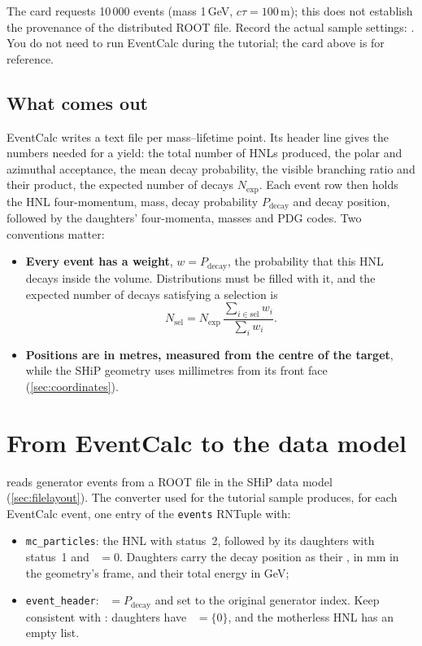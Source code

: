 \begin{note}
The card requests 10\,000 events (mass 1\,GeV, $c\tau=100$\,m);
this does not establish the provenance of the distributed ROOT file.
Record the actual sample settings: . You do not need to run EventCalc during the
tutorial; the card above is for reference.
\end{note}

\subsection{What comes out}

EventCalc writes a text file per mass--lifetime point. Its header line gives
the numbers needed for a yield: the total number of HNLs produced, the polar
and azimuthal acceptance, the mean decay probability, the visible branching
ratio and their product, the expected number of decays $N_\mathrm{exp}$. Each
event row then holds the HNL four-momentum, mass, decay probability
$P_\mathrm{decay}$ and decay position, followed by the daughters'
four-momenta, masses and PDG codes. Two conventions matter:

\begin{itemize}
  \item \textbf{Every event has a weight}, $w = P_\mathrm{decay}$, the
        probability that this HNL decays inside the volume. Distributions must
        be filled with it, and the expected number of decays satisfying a
        selection is
        \[
          N_\mathrm{sel} = N_\mathrm{exp}\,
          \frac{\sum_{i\in\mathrm{sel}} w_i}{\sum_{i} w_i}.
        \]
  \item \textbf{Positions are in metres, measured from the centre of the
        target}, while the SHiP geometry uses millimetres from its front face
        (\cref{sec:coordinates}).
\end{itemize}

\section{From EventCalc to the data model}

 reads generator events from a ROOT file in the SHiP data model
(\cref{sec:filelayout}). The converter used for the tutorial sample
 produces, for each EventCalc event, one entry of
the \texttt{events} RNTuple with:

\begin{itemize}
  \item \texttt{mc\_particles}: the HNL with status~2, followed by its
        daughters with status~1 and ~$=0$. Daughters carry
        the decay position as their , in mm in the geometry's
        frame, and their total energy in GeV;
  \item \texttt{event\_header}: ~$=P_\mathrm{decay}$ and
         set to the original generator index.
        Keep  consistent with : daughters
        have ~$=\{0\}$, and the motherless HNL has an empty list.
\end{itemize}

